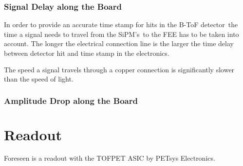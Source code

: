 \documentclass[12pt,a4paper,oneside]{article}
\newcommand{\btofD}{B-ToF detector}
\newcommand{\sipms}{SiPM's}
\begin{document}
\subsubsection{Signal Delay along the Board}

In order to provide an accurate time stamp for hits in the \btofD\ the time a signal needs to travel from the \sipms\ to the FEE has to be taken into account. The longer the electrical connection line is the larger the time delay between detector hit and time stamp in the electronics.

The speed a signal travels through a copper connection is significantly slower than the speed of light.

\subsubsection{Amplitude Drop along the Board}


\section{Readout}

Foreseen is a readout with the TOFPET ASIC by PETsys Electronics.


\newpage
\listoftodos
\end{document}
